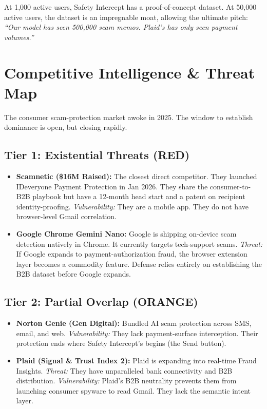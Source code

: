 \documentclass[12pt, letterpaper]{article}
\begin{document}
At 1,000 active users, Safety Intercept has a proof-of-concept dataset. At 50,000 active users, the dataset is an impregnable moat, allowing the ultimate pitch: \textit{``Our model has seen 500,000 scam memos. Plaid's has only seen payment volumes.''}

\newpage
\section{Competitive Intelligence \& Threat Map}

The consumer scam-protection market awoke in 2025. The window to establish dominance is open, but closing rapidly.

\subsection{Tier 1: Existential Threats (RED)}
\begin{itemize}
    \item \textbf{Scamnetic (\$16M Raised):} The closest direct competitor. They launched IDeveryone Payment Protection in Jan 2026. They share the consumer-to-B2B playbook but have a 12-month head start and a patent on recipient identity-proofing. \textit{Vulnerability:} They are a mobile app. They do not have browser-level Gmail correlation.
    \item \textbf{Google Chrome Gemini Nano:} Google is shipping on-device scam detection natively in Chrome. It currently targets tech-support scams. \textit{Threat:} If Google expands to payment-authorization fraud, the browser extension layer becomes a commodity feature. Defense relies entirely on establishing the B2B dataset before Google expands.
\end{itemize}

\subsection{Tier 2: Partial Overlap (ORANGE)}
\begin{itemize}
    \item \textbf{Norton Genie (Gen Digital):} Bundled AI scam protection across SMS, email, and web. \textit{Vulnerability:} They lack payment-surface interception. Their protection ends where Safety Intercept's begins (the Send button).
    \item \textbf{Plaid (Signal \& Trust Index 2):} Plaid is expanding into real-time Fraud Insights. \textit{Threat:} They have unparalleled bank connectivity and B2B distribution. \textit{Vulnerability:} Plaid's B2B neutrality prevents them from launching consumer spyware to read Gmail. They lack the semantic intent layer.
\end{itemize}
\end{document}
